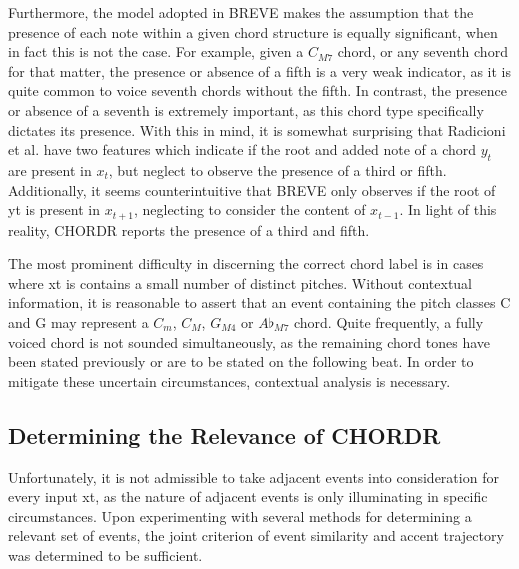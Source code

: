 \documentclass{article} %
\begin{document}
Furthermore, the model adopted in BREVE makes the assumption that the presence of each note within a given chord structure is equally significant, when in fact this is not the case. For example, given a $C_{M7}$ chord, or any seventh chord for that matter, the presence or absence of a fifth is a very weak indicator, as it is quite common to voice seventh chords without the fifth. In contrast, the presence or absence of a seventh is extremely important, as this chord type specifically dictates its presence. With this in mind, it is somewhat surprising that Radicioni et al. have two features which indicate if the root and added note of a chord $y_t$ are present in $x_t$, but neglect to observe the presence of a third or fifth. Additionally, it seems counterintuitive that BREVE only observes if the root of yt is present in $x_{t+1}$, neglecting to consider the content of $x_{t-1}$. In light of this reality, CHORDR reports the presence of a third and fifth.

The most prominent difficulty in discerning the correct chord label is in cases where xt is contains a small number of distinct pitches. Without contextual information, it is reasonable to assert that an event containing the pitch classes C and G may represent a $C_{m}$, $C_{M}$, $G_{M4}$ or $A\flat_{M7}$ chord. Quite frequently, a fully voiced chord is not sounded simultaneously, as the remaining chord tones have been stated previously or are to be stated on the following beat. In order to mitigate these uncertain circumstances, contextual analysis is necessary.

\subsection{Determining the Relevance of CHORDR}

Unfortunately, it is not admissible to take adjacent events into consideration for every input xt, as the nature of adjacent events is only illuminating in specific circumstances. Upon experimenting with several methods for determining a relevant set of events, the joint criterion of event similarity and accent trajectory was determined to be sufficient.
\end{document}
